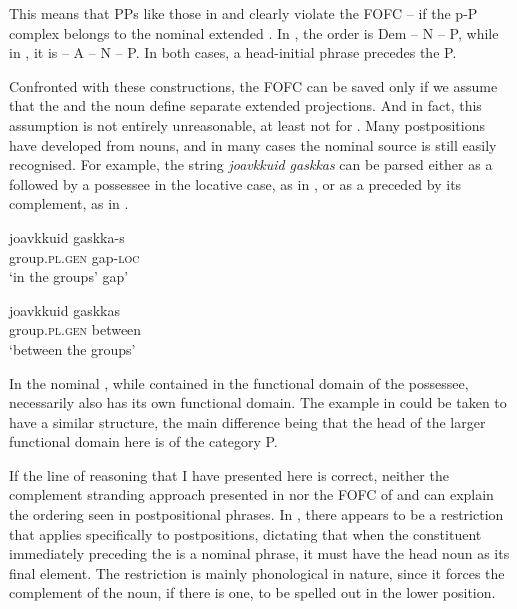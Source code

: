 \documentclass[output=paper]{LSP/langsci}
\begin{document}
This means that PPs like those in  and  clearly violate the FOFC – if the p-P complex belongs to the nominal extended . In , the order is Dem – N – P, while in , it is  – A – N – P. In both cases, a head-initial phrase precedes the P.


Confronted with these constructions, the FOFC can be saved only if we assume that the  and the noun define separate extended projections. And in fact, this assumption is not entirely unreasonable, at least not for . Many  postpositions have developed from nouns, and in many cases the nominal source is still easily recognised. For example, the string \textit{joavkkuid gaskkas} can be parsed either as a  followed by a possessee in the locative case, as in , or as a  preceded by its complement, as in .


\ea%
    \label{ex:julien:33}
    \ea \label{ex:julien:33a}
\gll joavkkuid    gaskka-s\\
         group.\textsc{pl.gen}  gap-\textsc{loc}   \\ 
    \glt   ‘in the groups’ gap’

\ex \label{ex:julien:33b}
\gll joavkkuid      gaskkas\\
      group.\textsc{pl.gen}    between\\
\glt       ‘between the groups’
\z
\z\largerpage[2]

In  the nominal , while contained in the functional domain of the possessee, necessarily also has its own functional domain. The example in  could be taken to have a similar structure, the main difference being that the head of the larger functional domain here is of the category P. 


If the line of reasoning that I have presented here is correct, neither the complement stranding approach presented in \citet{Sheehan2009} nor the FOFC of \citet{Holmberg2000deriving} and \citet{BiberauerEtAl2008,BiberauerEtAl2014syntactic} can explain the ordering seen in  postpositional phrases. In , there appears to be a restriction that applies specifically to postpositions, dictating that when the constituent immediately preceding the  is a nominal phrase, it must have the head noun as its final element. The restriction is mainly phonological in nature, since it forces the complement of the noun, if there is one, to be spelled out in the lower position.
\end{document}
